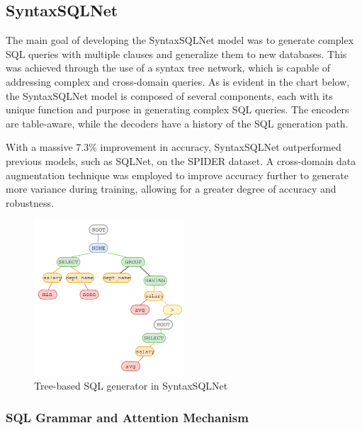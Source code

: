 \subsection{SyntaxSQLNet}

The main goal of developing the SyntaxSQLNet model\cite{DBLP:journals/corr/abs-1810-05237} was to generate complex SQL queries with multiple clauses and generalize them to new databases.
This was achieved through the use of a syntax tree network, which is capable of addressing complex and cross-domain queries.
As is evident in the chart below, the SyntaxSQLNet model is composed of several components, each with its unique function and purpose in generating complex SQL queries. The encoders are table-aware, while the decoders have a history of the SQL generation path.

With a massive 7.3\% improvement in accuracy, SyntaxSQLNet outperformed previous models, such as SQLNet, on the SPIDER dataset.
A cross-domain data augmentation technique was employed to improve accuracy further to generate more variance during training, allowing for a greater degree of accuracy and robustness.

\begin{figure}[htb]
    \centering
    \includegraphics[width=0.5\textwidth]{pics/SyntaxSQLNet/Tree-based.png}
    \caption{Tree-based SQL generator in SyntaxSQLNet\cite{DBLP:journals/corr/abs-1810-05237}}
    \label{fig:tree-based}
\end{figure}


\subsubsection*{SQL Grammar and Attention Mechanism}

